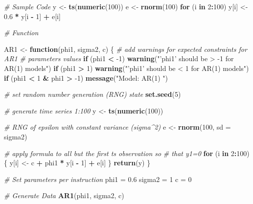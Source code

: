\documentclass[openany]{book}
\newenvironment{Shaded}{\begin{snugshade}}{\end{snugshade}}
\newcommand{\CommentTok}[1]{\textcolor[rgb]{0.56,0.35,0.01}{\textit{#1}}}
\newcommand{\ControlFlowTok}[1]{\textcolor[rgb]{0.13,0.29,0.53}{\textbf{#1}}}
\newcommand{\DataTypeTok}[1]{\textcolor[rgb]{0.13,0.29,0.53}{#1}}
\newcommand{\DecValTok}[1]{\textcolor[rgb]{0.00,0.00,0.81}{#1}}
\newcommand{\FloatTok}[1]{\textcolor[rgb]{0.00,0.00,0.81}{#1}}
\newcommand{\KeywordTok}[1]{\textcolor[rgb]{0.13,0.29,0.53}{\textbf{#1}}}
\newcommand{\NormalTok}[1]{#1}
\newcommand{\OperatorTok}[1]{\textcolor[rgb]{0.81,0.36,0.00}{\textbf{#1}}}
\newcommand{\StringTok}[1]{\textcolor[rgb]{0.31,0.60,0.02}{#1}}
\begin{document}
\begin{Shaded}
\begin{Highlighting}[]
\CommentTok{# Sample Code}
\NormalTok{y <-}\StringTok{ }\KeywordTok{ts}\NormalTok{(}\KeywordTok{numeric}\NormalTok{(}\DecValTok{100}\NormalTok{))}
\NormalTok{e <-}\StringTok{ }\KeywordTok{rnorm}\NormalTok{(}\DecValTok{100}\NormalTok{)}
\ControlFlowTok{for}\NormalTok{ (i }\ControlFlowTok{in} \DecValTok{2}\OperatorTok{:}\DecValTok{100}\NormalTok{) y[i] <-}\StringTok{ }\FloatTok{0.6} \OperatorTok{*}\StringTok{ }\NormalTok{y[i }\OperatorTok{-}\StringTok{ }\DecValTok{1}\NormalTok{] }\OperatorTok{+}\StringTok{ }\NormalTok{e[i]}

\CommentTok{# Function}

\NormalTok{AR1 <-}\StringTok{ }\ControlFlowTok{function}\NormalTok{(phi1, sigma2, c) \{}
  \CommentTok{# add warnings for expected constraints for AR1}
  \CommentTok{# parameters values}
  \ControlFlowTok{if}\NormalTok{ (phi1 }\OperatorTok{<}\StringTok{ }\DecValTok{-1}\NormalTok{) }
    \KeywordTok{warning}\NormalTok{(}\StringTok{"'phi1' should be > -1 for AR(1) models"}\NormalTok{)}
  \ControlFlowTok{if}\NormalTok{ (phi1 }\OperatorTok{>}\StringTok{ }\DecValTok{1}\NormalTok{) }
    \KeywordTok{warning}\NormalTok{(}\StringTok{"'phi1' should be < 1 for AR(1) models"}\NormalTok{)}
  \ControlFlowTok{if}\NormalTok{ (phi1 }\OperatorTok{<}\StringTok{ }\DecValTok{1} \OperatorTok{&}\StringTok{ }\NormalTok{phi1 }\OperatorTok{>}\StringTok{ }\DecValTok{-1}\NormalTok{) }
    \KeywordTok{message}\NormalTok{(}\StringTok{"Model: AR(1) "}\NormalTok{)}
  
  \CommentTok{# set random number generation (RNG) state}
  \KeywordTok{set.seed}\NormalTok{(}\DecValTok{5}\NormalTok{)}
  
  \CommentTok{# generate time series 1:100}
\NormalTok{  y <-}\StringTok{ }\KeywordTok{ts}\NormalTok{(}\KeywordTok{numeric}\NormalTok{(}\DecValTok{100}\NormalTok{))}
  
  \CommentTok{# RNG of epsilon with constant variance (sigma^2)}
\NormalTok{  e <-}\StringTok{ }\KeywordTok{rnorm}\NormalTok{(}\DecValTok{100}\NormalTok{, }\DataTypeTok{sd =}\NormalTok{ sigma2)}
  
  \CommentTok{# apply formula to all but the first ts observation so}
  \CommentTok{# that y1=0}
  \ControlFlowTok{for}\NormalTok{ (i }\ControlFlowTok{in} \DecValTok{2}\OperatorTok{:}\DecValTok{100}\NormalTok{) \{}
\NormalTok{    y[i] <-}\StringTok{ }\NormalTok{c }\OperatorTok{+}\StringTok{ }\NormalTok{phi1 }\OperatorTok{*}\StringTok{ }\NormalTok{y[i }\OperatorTok{-}\StringTok{ }\DecValTok{1}\NormalTok{] }\OperatorTok{+}\StringTok{ }\NormalTok{e[i]}
\NormalTok{  \}}
  \KeywordTok{return}\NormalTok{(y)}
\NormalTok{\}}

\CommentTok{# Set parameters per instruction}
\NormalTok{phi1 =}\StringTok{ }\FloatTok{0.6}
\NormalTok{sigma2 =}\StringTok{ }\DecValTok{1}
\NormalTok{c =}\StringTok{ }\DecValTok{0}

\CommentTok{# Generate Data}
\KeywordTok{AR1}\NormalTok{(phi1, sigma2, c)}
\end{Highlighting}
\end{Shaded}
\end{document}
